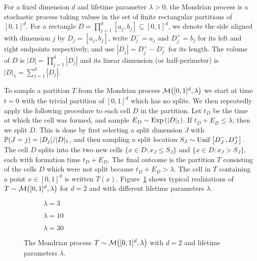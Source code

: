 For a fixed dimension $d$ and lifetime parameter $\lambda > 0$,
the Mondrian process is a stochastic process taking values
in the set of finite rectangular partitions of $[0,1]^d$.
For a rectangle $D = \prod_{j=1}^d [a_j, b_j] \subseteq [0,1]^d$,
we denote the side aligned with dimension $j$ by $D_j = [a_j, b_j]$,
write $D_j^- = a_j$ and $D_j^+ = b_j$ for its left and right
endpoints respectively,
and use $|D_j| = D_j^+ - D_j^-$ for its length.
The volume of $D$ is $|D| = \prod_{j=1}^{d} |D_j|$
and its linear dimension (or half-perimeter) is $|D|_1 = \sum_{j=1}^{d} |D_j|$.

To sample a partition $T$ from the Mondrian process
$\cM \big( [0,1]^d, \lambda \big)$
we start at time $t=0$ with the trivial partition
of $[0,1]^d$ which has no splits.
We then repeatedly apply the following procedure to each cell $D$
in the partition.
Let $t_D$ be the time at which the cell was formed,
and sample $E_D \sim \Exp \left( |D|_1 \right)$.
If $t_D + E_D \leq \lambda$, then we split $D$.
This is done by first selecting a split dimension $J$ with
$\P(J=j) = |D_j| / |D|_1$, and then sampling a split location
$S_J \sim \Unif\big[D_J^-, D_J^+\big]$.
The cell $D$ splits into the two new cells
$\{x \in D : x_J \leq S_J\}$ and $\{x \in D : x_J > S_J\}$,
each with formation time $t_D + E_D$.
The final outcome is the partition $T$ consisting of the cells $D$
which were not split because $t_D + E_D > \lambda$.
The cell in $T$ containing a point $x \in [0,1]^d$
is written $T(x)$.
Figure~\ref{fig:mondrian_process} shows typical realizations of
$T \sim \cM\big( [0,1]^d, \lambda \big)$ for
$d=2$ and with different lifetime parameters $\lambda$.
%
\begin{figure}[ht]
  \centering
  \begin{subfigure}{0.32\textwidth}
    \centering
    \resizebox{1.0\textwidth}{!}{
      
    }
    \caption{$\lambda = 3$}
  \end{subfigure}
  \begin{subfigure}{0.32\textwidth}
    \centering
    \resizebox{1.0\textwidth}{!}{
      
    }
    \caption{$\lambda = 10$}
  \end{subfigure}
  \begin{subfigure}{0.32\textwidth}
    \centering
    \resizebox{1.0\textwidth}{!}{
      
    }
    \caption{$\lambda = 30$}
  \end{subfigure}
  \caption{
    The Mondrian process
    $T \sim \cM \big( [0,1]^d, \lambda \big)$
    with $d=2$ and lifetime parameters $\lambda$.
  }
  \label{fig:mondrian_process}
\end{figure}

